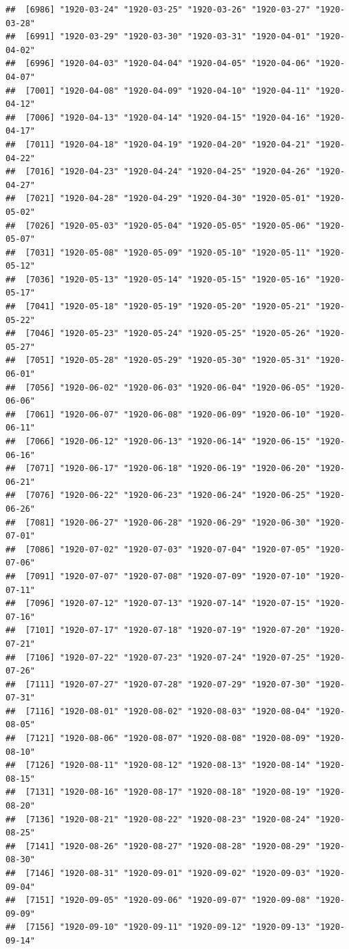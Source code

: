 \documentclass{article}\usepackage[]{graphicx}\usepackage[]{color}
\makeatletter
\newenvironment{kframe}{%
 \def\at@end@of@kframe{}%
 \ifinner\ifhmode%
  \def\at@end@of@kframe{\end{minipage}}%
  \begin{minipage}{\columnwidth}%
 \fi\fi%
 \def\FrameCommand##1{\hskip\@totalleftmargin \hskip-\fboxsep
 \colorbox{shadecolor}{##1}\hskip-\fboxsep
     \hskip-\linewidth \hskip-\@totalleftmargin \hskip\columnwidth}%
 \MakeFramed {\advance\hsize-\width
   \@totalleftmargin\z@ \linewidth\hsize
   \@setminipage}}%
 {\par\unskip\endMakeFramed%
 \at@end@of@kframe}
\newenvironment{knitrout}{}{} %
\makeatother
\begin{document}
\begin{description}
\begin{knitrout}
\begin{kframe}
\begin{verbatim}
##  [6986] "1920-03-24" "1920-03-25" "1920-03-26" "1920-03-27" "1920-03-28"
##  [6991] "1920-03-29" "1920-03-30" "1920-03-31" "1920-04-01" "1920-04-02"
##  [6996] "1920-04-03" "1920-04-04" "1920-04-05" "1920-04-06" "1920-04-07"
##  [7001] "1920-04-08" "1920-04-09" "1920-04-10" "1920-04-11" "1920-04-12"
##  [7006] "1920-04-13" "1920-04-14" "1920-04-15" "1920-04-16" "1920-04-17"
##  [7011] "1920-04-18" "1920-04-19" "1920-04-20" "1920-04-21" "1920-04-22"
##  [7016] "1920-04-23" "1920-04-24" "1920-04-25" "1920-04-26" "1920-04-27"
##  [7021] "1920-04-28" "1920-04-29" "1920-04-30" "1920-05-01" "1920-05-02"
##  [7026] "1920-05-03" "1920-05-04" "1920-05-05" "1920-05-06" "1920-05-07"
##  [7031] "1920-05-08" "1920-05-09" "1920-05-10" "1920-05-11" "1920-05-12"
##  [7036] "1920-05-13" "1920-05-14" "1920-05-15" "1920-05-16" "1920-05-17"
##  [7041] "1920-05-18" "1920-05-19" "1920-05-20" "1920-05-21" "1920-05-22"
##  [7046] "1920-05-23" "1920-05-24" "1920-05-25" "1920-05-26" "1920-05-27"
##  [7051] "1920-05-28" "1920-05-29" "1920-05-30" "1920-05-31" "1920-06-01"
##  [7056] "1920-06-02" "1920-06-03" "1920-06-04" "1920-06-05" "1920-06-06"
##  [7061] "1920-06-07" "1920-06-08" "1920-06-09" "1920-06-10" "1920-06-11"
##  [7066] "1920-06-12" "1920-06-13" "1920-06-14" "1920-06-15" "1920-06-16"
##  [7071] "1920-06-17" "1920-06-18" "1920-06-19" "1920-06-20" "1920-06-21"
##  [7076] "1920-06-22" "1920-06-23" "1920-06-24" "1920-06-25" "1920-06-26"
##  [7081] "1920-06-27" "1920-06-28" "1920-06-29" "1920-06-30" "1920-07-01"
##  [7086] "1920-07-02" "1920-07-03" "1920-07-04" "1920-07-05" "1920-07-06"
##  [7091] "1920-07-07" "1920-07-08" "1920-07-09" "1920-07-10" "1920-07-11"
##  [7096] "1920-07-12" "1920-07-13" "1920-07-14" "1920-07-15" "1920-07-16"
##  [7101] "1920-07-17" "1920-07-18" "1920-07-19" "1920-07-20" "1920-07-21"
##  [7106] "1920-07-22" "1920-07-23" "1920-07-24" "1920-07-25" "1920-07-26"
##  [7111] "1920-07-27" "1920-07-28" "1920-07-29" "1920-07-30" "1920-07-31"
##  [7116] "1920-08-01" "1920-08-02" "1920-08-03" "1920-08-04" "1920-08-05"
##  [7121] "1920-08-06" "1920-08-07" "1920-08-08" "1920-08-09" "1920-08-10"
##  [7126] "1920-08-11" "1920-08-12" "1920-08-13" "1920-08-14" "1920-08-15"
##  [7131] "1920-08-16" "1920-08-17" "1920-08-18" "1920-08-19" "1920-08-20"
##  [7136] "1920-08-21" "1920-08-22" "1920-08-23" "1920-08-24" "1920-08-25"
##  [7141] "1920-08-26" "1920-08-27" "1920-08-28" "1920-08-29" "1920-08-30"
##  [7146] "1920-08-31" "1920-09-01" "1920-09-02" "1920-09-03" "1920-09-04"
##  [7151] "1920-09-05" "1920-09-06" "1920-09-07" "1920-09-08" "1920-09-09"
##  [7156] "1920-09-10" "1920-09-11" "1920-09-12" "1920-09-13" "1920-09-14"

\end{verbatim}
\end{kframe}
\end{knitrout}
\end{description}
\end{document}
